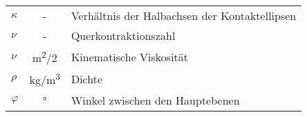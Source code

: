 \begin{longtable}{>{$}l<{$}cp{12cm}}
    \kappa           & -                                        & Verhältnis der Halbachsen der Kontaktellipsen                \\
    \nu              & -                                        & Querkontraktionszahl                                         \\
    \nu              & \si{m^2/2}                               & Kinematische Viskosität                                      \\
    \rho             & \si{kg/m^3}                              & Dichte                                                       \\
    \varphi          & \si{\degree}                             & Winkel zwischen den Hauptebenen                              \\
\end{longtable}%

